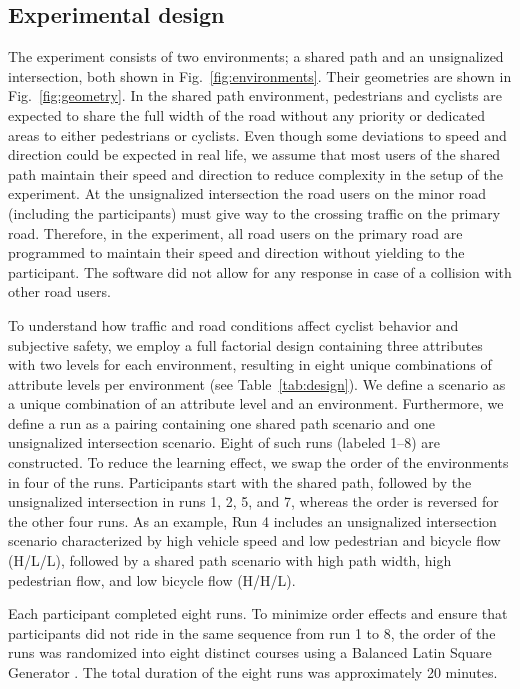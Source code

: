 \documentclass[3p,authoryear]{elsarticle}
\begin{document}
\subsection{Experimental design}
The experiment consists of two environments; a shared path and an unsignalized
intersection, both shown in Fig.~\ref{fig:environments}. Their geometries are
shown in Fig.~\ref{fig:geometry}. In the shared path environment, pedestrians and
cyclists are expected to share the full width of the road without any priority
or dedicated areas to either pedestrians or cyclists. Even though some deviations
to speed and direction could be expected in real life, we assume that most users
of the shared path maintain their speed and direction to reduce complexity in the
setup of the experiment. At the unsignalized intersection the road users on the
minor road (including the participants) must give way to the crossing traffic on
the primary road. Therefore, in the experiment, all road users on the primary
road are programmed to maintain their speed and direction without yielding to the
participant. The software did not allow for any response in case of a collision
with other road users.

To understand how traffic and road conditions affect cyclist behavior and
subjective safety, we employ a full factorial design containing three attributes
with two levels for each environment, resulting in eight unique combinations of
attribute levels per environment (see Table~\ref{tab:design}). We define a
scenario as a unique combination of an attribute level and an environment.
Furthermore, we define a run as a pairing containing one shared path scenario and
one unsignalized intersection scenario. Eight of such runs (labeled 1--8) are
constructed. To reduce the learning effect, we swap the order of the environments
in four of the runs. Participants start with the shared path, followed by the
unsignalized intersection in runs 1, 2, 5, and 7, whereas the order is reversed
for the other four runs. As an example, Run 4 includes an unsignalized
intersection scenario characterized by high vehicle speed and low pedestrian and
bicycle flow (H/L/L), followed by a shared path scenario with high path width,
high pedestrian flow, and low bicycle flow (H/H/L).

Each participant completed eight runs. To minimize order effects and ensure that
participants did not ride in the same sequence from run 1 to 8, the order of the
runs was randomized into eight distinct courses using a Balanced Latin Square
Generator \citep{masson2024latin}. The total duration of the eight runs was
approximately 20 minutes.
\end{document}
